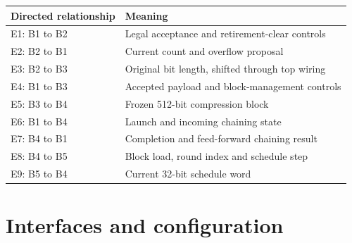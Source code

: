 \documentclass[11pt,a4paper]{article}
\begin{document}
{\small\renewcommand{\arraystretch}{1.18}\begin{longtable}{@{}L{0.24\textwidth}|L{0.7\textwidth}@{}}\toprule

\textbf{Directed relationship} & \textbf{Meaning}\\\midrule\endhead

E1: B1 to B2 & Legal acceptance and retirement-clear controls\\[2pt]\hline

E2: B2 to B1 & Current count and overflow proposal\\[2pt]\hline

E3: B2 to B3 & Original bit length,\allowbreak{} shifted through top wiring\\[2pt]\hline

E4: B1 to B3 & Accepted payload and block-management controls\\[2pt]\hline

E5: B3 to B4 & Frozen 512-bit compression block\\[2pt]\hline

E6: B1 to B4 & Launch and incoming chaining state\\[2pt]\hline

E7: B4 to B1 & Completion and feed-forward chaining result\\[2pt]\hline

E8: B4 to B5 & Block load,\allowbreak{} round index and schedule step\\[2pt]\hline

E9: B5 to B4 & Current 32-bit schedule word\\[2pt]\hline

\bottomrule\end{longtable}}

\section{Interfaces and configuration}
\end{document}
